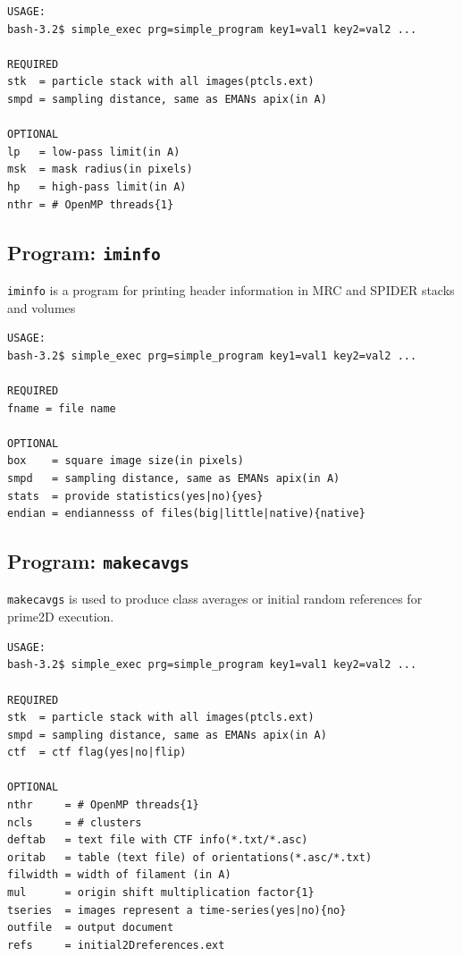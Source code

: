 \documentclass[a4paper,11pt]{article}
\newcommand{\prgname}[1]{\textcolor{NavyBlue}{\texttt{#1}}}
\begin{document}
\begin{verbatim}
USAGE:
bash-3.2$ simple_exec prg=simple_program key1=val1 key2=val2 ...

REQUIRED
stk  = particle stack with all images(ptcls.ext)
smpd = sampling distance, same as EMANs apix(in A)

OPTIONAL
lp   = low-pass limit(in A)
msk  = mask radius(in pixels)
hp   = high-pass limit(in A)
nthr = # OpenMP threads{1}
\end{verbatim}

\subsection{Program: \prgname{iminfo}}
\label{iminfo}
\prgname{iminfo} is a program for printing header information in MRC and SPIDER stacks and volumes

\begin{verbatim}
USAGE:
bash-3.2$ simple_exec prg=simple_program key1=val1 key2=val2 ...

REQUIRED
fname = file name

OPTIONAL
box    = square image size(in pixels)
smpd   = sampling distance, same as EMANs apix(in A)
stats  = provide statistics(yes|no){yes}
endian = endiannesss of files(big|little|native){native}
\end{verbatim}

\subsection{Program: \prgname{makecavgs}}
\label{makecavgs}
\prgname{makecavgs} is used  to produce class averages or initial random references for prime2D execution. 

\begin{verbatim}
USAGE:
bash-3.2$ simple_exec prg=simple_program key1=val1 key2=val2 ...

REQUIRED
stk  = particle stack with all images(ptcls.ext)
smpd = sampling distance, same as EMANs apix(in A)
ctf  = ctf flag(yes|no|flip)

OPTIONAL
nthr     = # OpenMP threads{1}
ncls     = # clusters
deftab   = text file with CTF info(*.txt/*.asc)
oritab   = table (text file) of orientations(*.asc/*.txt)
filwidth = width of filament (in A)
mul      = origin shift multiplication factor{1}
tseries  = images represent a time-series(yes|no){no}
outfile  = output document
refs     = initial2Dreferences.ext
\end{verbatim}
\end{document}
